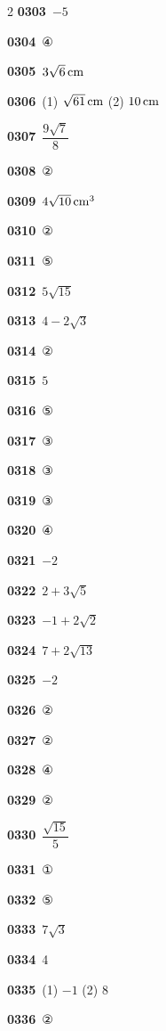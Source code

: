 \documentclass[10pt,a4paper]{article}
\begin{document}
\begin{multicols}{2}
\noindent\textbf{0303}\ $-5$\par
\noindent\textbf{0304}\ ④\par
\noindent\textbf{0305}\ $3\sqrt{6}\mkern3mu \mathrm{cm}$\par
\noindent\textbf{0306}\ (1) $\sqrt{61}\mkern3mu \mathrm{cm}$ (2) $10\mkern3mu \mathrm{cm}$\par
\noindent\textbf{0307}\ $\dfrac{9\sqrt{7}}{8}$\par
\noindent\textbf{0308}\ ②\par
\noindent\textbf{0309}\ $4\sqrt{10}\mkern3mu \mathrm{cm}^3$\par
\noindent\textbf{0310}\ ②\par
\noindent\textbf{0311}\ ⑤\par
\noindent\textbf{0312}\ $5\sqrt{15}$\par
\noindent\textbf{0313}\ $4-2\sqrt{3}$\par
\noindent\textbf{0314}\ ②\par
\noindent\textbf{0315}\ $5$\par
\noindent\textbf{0316}\ ⑤\par
\noindent\textbf{0317}\ ③\par
\noindent\textbf{0318}\ ③\par
\noindent\textbf{0319}\ ③\par
\noindent\textbf{0320}\ ④\par
\noindent\textbf{0321}\ $-2$\par
\noindent\textbf{0322}\ $2+3\sqrt{5}$\par
\noindent\textbf{0323}\ $-1+2\sqrt{2}$\par
\noindent\textbf{0324}\ $7+2\sqrt{13}$\par
\noindent\textbf{0325}\ $-2$\par
\noindent\textbf{0326}\ ②\par
\noindent\textbf{0327}\ ②\par
\noindent\textbf{0328}\ ④\par
\noindent\textbf{0329}\ ②\par
\noindent\textbf{0330}\ $\dfrac{\sqrt{15}}{5}$\par
\noindent\textbf{0331}\ ①\par
\noindent\textbf{0332}\ ⑤\par
\noindent\textbf{0333}\ $7\sqrt{3}$\par
\noindent\textbf{0334}\ 4\par
\noindent\textbf{0335}\ (1) $-1$ (2) 8\par
\noindent\textbf{0336}\ ②\par

\end{multicols}
\end{document}

